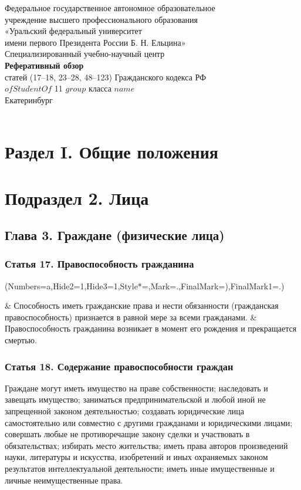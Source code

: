 \documentclass[a4page]{report}
\newcommand{\beginEasyList}{
        \begin{easylist}[enumerate]
            \ListProperties(Numbers=a,Hide2=1,Hide3=1,Style*=,Mark=.,FinalMark={)},FinalMark1=.)
    }
\newcommand{\eEasyList}{\end{easylist}}
\begin{document}
\begin{titlepage}
    \center
    \Large

    Федеральное государственное автономное образовательное\\
    учреждение высшего профессионального образования\\
    «Уральский федеральный университет\\
    имени первого Президента России Б. Н. Ельцина»\\
    Специализированный учебно-научный центр\\

    \vfill
    \textbf{Реферативный обзор}\\
    статей (17--18, 23--28, 48--123) Гражданского кодекса РФ\\
    $ofStudentOf$ 11 $group$ класса $name$\\

    \vfill
    {Екатеринбург}\\
    {\the\year}\\
\end{titlepage}

\section{{\bf Раздел I. Общие положения}}
\section{{\bf Подраздел 2. Лица}}
\subsection{{\bf Глава 3. Граждане (физические лица)}}

\subsubsection{{\bf Статья 17.} Правоспособность гражданина}
\beginEasyList
& Способность иметь гражданские права и нести обязанности (гражданская правоспособность) признается в равной мере за всеми гражданами.
& Правоспособность гражданина возникает в момент его рождения и прекращается смертью.
\eEasyList
\subsubsection{{\bf Статья 18.} Содержание правоспособности граждан}
\par Граждане могут иметь имущество на праве собственности; наследовать и завещать имущество; заниматься предпринимательской и любой иной не запрещенной законом деятельностью; создавать юридические лица самостоятельно или совместно с другими гражданами и юридическими лицами; совершать любые не противоречащие закону сделки и участвовать в обязательствах; избирать место жительства; иметь права авторов произведений науки, литературы и искусства, изобретений и иных охраняемых законом результатов интеллектуальной деятельности; иметь иные имущественные и личные неимущественные права.
\end{document}
